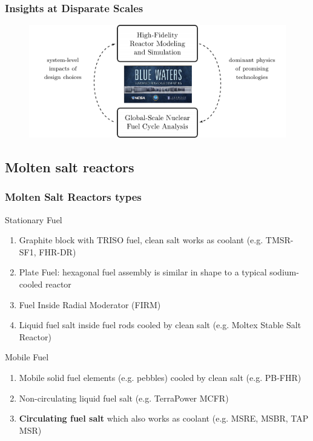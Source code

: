 \begin{frame}
  \frametitle{Insights at Disparate Scales}
               \begin{figure}[t]
                \vspace*{-0.1in}
			\hspace*{-0.35in}
                \includegraphics[height=0.5\textwidth]{./images/synergy.png}
               \end{figure}            
\end{frame}

\subsection{Molten salt reactors}
\begin{frame}
  \frametitle{Molten Salt Reactors types}
                  \vspace*{-0.1in}
              \begin{block}{Stationary Fuel}
               \begin{enumerate}
                \item Graphite block with TRISO fuel, clean salt works as coolant (e.g. TMSR-SF1, FHR-DR)
                \item Plate Fuel: hexagonal fuel assembly is similar in shape to a typical sodium-cooled reactor
                \item Fuel Inside Radial Moderator (FIRM)
                \item Liquid fuel salt inside fuel rods cooled by clean salt (e.g. Moltex Stable Salt Reactor)
               \end{enumerate}
               \end{block}
               
               \begin{block}{Mobile Fuel}
               \begin{enumerate}
                \item Mobile solid fuel elements (e.g. pebbles) cooled by clean salt (e.g. PB-FHR)
                \item Non-circulating liquid fuel salt (e.g. TerraPower MCFR) 
                \item \textbf{Circulating fuel salt} which also works as coolant (e.g. \gls{MSRE}, \gls{MSBR}, TAP MSR)
               \end{enumerate}
               \end{block}
\end{frame}

